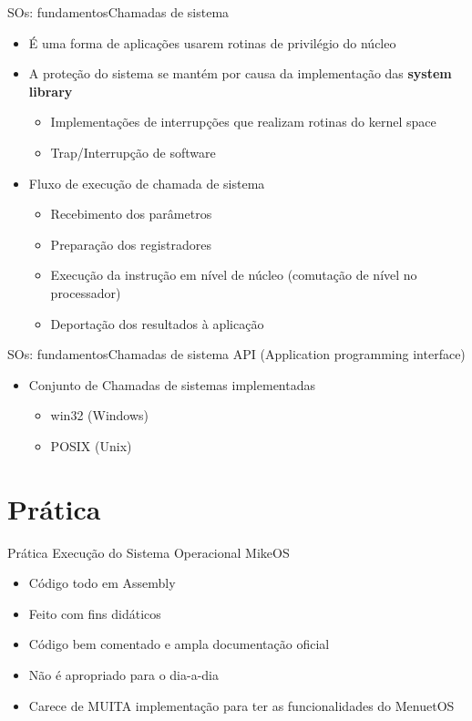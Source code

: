 \documentclass{beamer}
\begin{document}
      \begin{frame}{SOs: fundamentos}{Chamadas de sistema}
        \begin{itemize}
          \item É uma forma de aplicações usarem rotinas de privilégio do núcleo 
          \item A proteção do sistema se mantém por causa da implementação das {\bfseries{system library}}
          \begin{itemize}
            \item Implementações de interrupções que realizam rotinas do kernel space
            \item Trap/Interrupção de software
          \end{itemize}
          \item Fluxo de execução de chamada de sistema
          \begin{itemize}
            \item Recebimento dos parâmetros
            \item Preparação dos registradores
            \item Execução da instrução em nível de núcleo (comutação de nível no processador)
            \item Deportação dos resultados à aplicação 
          \end{itemize}
        \end{itemize}  
      \end{frame} 
      
      \begin{frame}{SOs: fundamentos}{Chamadas de sistema}
        API (Application programming interface)
        \begin{itemize}
          \item Conjunto de Chamadas de sistemas implementadas
          \begin{itemize}
            \item win32 (Windows)
            \item POSIX (Unix)
          \end{itemize}
        \end{itemize}  
      \end{frame} 
  
  \section{Prática}
    
    \begin{frame}{Prática}
      Execução do Sistema Operacional MikeOS
      \begin{itemize}
        \item Código todo em Assembly
        \item Feito com fins didáticos
        \item Código bem comentado e ampla documentação oficial
        \item Não é apropriado para o dia-a-dia
        \item Carece de MUITA implementação para ter as funcionalidades do MenuetOS
      \end{itemize}
    \end{frame}
  
\end{document}
